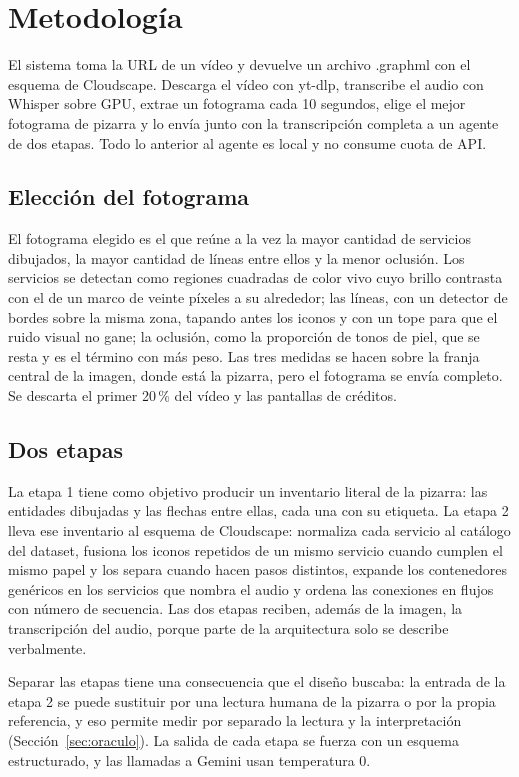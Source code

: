 \documentclass[a4paper, twocolumn, 10pt]{IEEEtran}
\begin{document}
\section{Metodología}

El sistema toma la URL de un vídeo y devuelve un archivo .graphml con el esquema de
Cloudscape. Descarga el vídeo con yt-dlp, transcribe el audio con Whisper sobre GPU,
extrae un fotograma cada 10 segundos, elige el mejor fotograma de pizarra y lo envía
junto con la transcripción completa a un agente de dos etapas. Todo lo anterior al
agente es local y no consume cuota de API.

\subsection{Elección del fotograma}

El fotograma elegido es el que reúne a la vez la mayor cantidad de servicios
dibujados, la mayor cantidad de líneas entre ellos y la menor oclusión. Los
servicios se detectan como regiones cuadradas de color vivo cuyo brillo contrasta
con el de un marco de veinte píxeles a su alrededor; las líneas, con un detector de
bordes sobre la misma zona, tapando antes los iconos y con un tope para que el
ruido visual no gane; la oclusión, como la proporción de tonos de piel, que se resta
y es el término con más peso. Las tres medidas se hacen sobre la franja central de
la imagen, donde está la pizarra, pero el fotograma se envía completo. Se descarta
el primer 20\,\% del vídeo y las pantallas de créditos.

\subsection{Dos etapas}

La etapa 1 tiene como objetivo producir un inventario literal de la pizarra: las
entidades dibujadas y las flechas entre ellas, cada una con su etiqueta. La etapa 2
lleva ese inventario al esquema de Cloudscape: normaliza cada servicio al catálogo
del dataset, fusiona los iconos repetidos de un mismo servicio cuando cumplen el
mismo papel y los separa cuando hacen pasos distintos, expande los contenedores
genéricos en los servicios que nombra el audio y ordena las conexiones en flujos con
número de secuencia. Las dos etapas reciben, además de la imagen, la transcripción
del audio, porque parte de la arquitectura solo se describe verbalmente.

Separar las etapas tiene una consecuencia que el diseño buscaba: la entrada de la
etapa 2 se puede sustituir por una lectura humana de la pizarra o por la propia
referencia, y eso permite medir por separado la lectura y la interpretación
(Sección~\ref{sec:oraculo}). La salida de cada etapa se fuerza con un esquema
estructurado, y las llamadas a Gemini usan temperatura 0.
\end{document}
